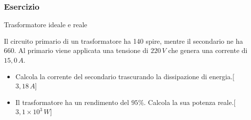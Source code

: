 \documentclass[]{beamer}
\theoremstyle{plain}
\begin{document}
\begin{frame}
\frametitle{Esercizio}
\begin{exampleblock}{Trasformatore ideale e reale}
  \small{
    Il circuito primario di un trasformatore ha 140 spire, mentre il secondario ne ha 660. Al primario viene applicata una tensione di $ 220 \, V $ che genera una corrente di $ 15,0 \, A $.

    \begin{itemize}
      \item Calcola la corrente del secondario trascurando la dissipazione di energia.\hspace*{\fill}[$ 3,18 \, A $]
      \item Il trasformatore ha un rendimento del $ 95\% $. Calcola la sua potenza reale.\hspace*{\fill}[$ 3,1 \times 10^{3} \, W $]
    \end{itemize}}
\end{exampleblock}
\end{frame}
\end{document}
